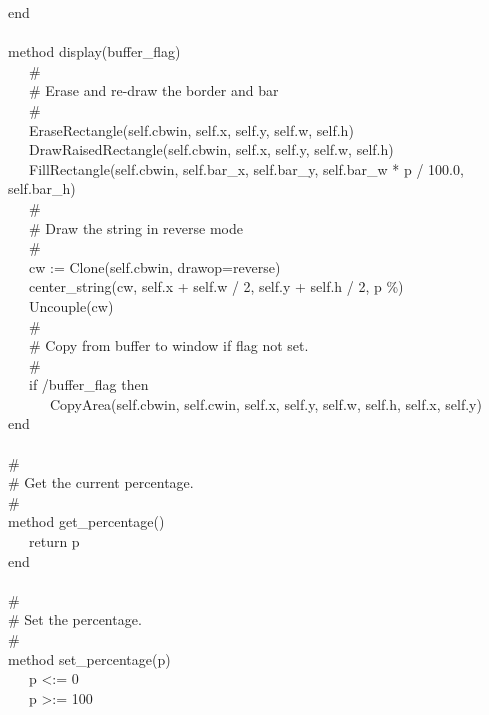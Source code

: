 {\>   end \\
\ \\
\>   method display(buffer\_flag) \\
\>   \ \ \ \# \\
\>   \ \ \ \# Erase and re-draw the border and bar \\
\>   \ \ \ \# \\
\>   \ \ \ EraseRectangle(self.cbwin, self.x, self.y, self.w, self.h) \\
\>   \ \ \ DrawRaisedRectangle(self.cbwin, self.x, self.y, self.w,
self.h) \\
\>   \ \ \ FillRectangle(self.cbwin, self.bar\_x, self.bar\_y,
self.bar\_w * p / 100.0, self.bar\_h) \\
\>   \ \ \ \# \\
\>   \ \ \ \# Draw the string in reverse mode \\
\>   \ \ \ \# \\
\>   \ \ \ cw := Clone(self.cbwin,
{\textquotedbl}drawop=reverse{\textquotedbl}) \\
\>   \ \ \ center\_string(cw, self.x + self.w / 2, self.y + self.h / 2,
p {\textbar}{\textbar} {\textquotedbl}\%{\textquotedbl}) \\
\>   \ \ \ Uncouple(cw) \\
\>   \ \ \ \# \\
\>   \ \ \ \# Copy from buffer to window if flag not set. \\
\>   \ \ \ \# \\
\>   \ \ \ if /buffer\_flag then \\
\>   \ \ \ \ \ \ CopyArea(self.cbwin, self.cwin, self.x, self.y,
self.w, self.h, self.x, self.y) \\
\>   end \\
\ \\
\>   \# \\
\>   \# Get the current percentage. \\
\>   \# \\
\>   method get\_percentage() \\
\>   \ \ \ return p \\
\>   end \\
\ \\
\>   \# \\
\>   \# Set the percentage. \\
\>   \# \\
\>   method set\_percentage(p) \\
\>   \ \ \ p {\textless}:= 0 \\
\>   \ \ \ p {\textgreater}:= 100 \\
}
